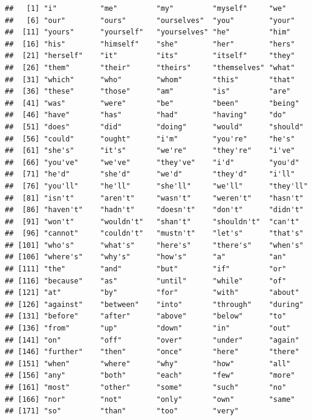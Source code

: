 \documentclass[]{book}
\begin{document}
\begin{verbatim}
##   [1] "i"          "me"         "my"         "myself"     "we"        
##   [6] "our"        "ours"       "ourselves"  "you"        "your"      
##  [11] "yours"      "yourself"   "yourselves" "he"         "him"       
##  [16] "his"        "himself"    "she"        "her"        "hers"      
##  [21] "herself"    "it"         "its"        "itself"     "they"      
##  [26] "them"       "their"      "theirs"     "themselves" "what"      
##  [31] "which"      "who"        "whom"       "this"       "that"      
##  [36] "these"      "those"      "am"         "is"         "are"       
##  [41] "was"        "were"       "be"         "been"       "being"     
##  [46] "have"       "has"        "had"        "having"     "do"        
##  [51] "does"       "did"        "doing"      "would"      "should"    
##  [56] "could"      "ought"      "i'm"        "you're"     "he's"      
##  [61] "she's"      "it's"       "we're"      "they're"    "i've"      
##  [66] "you've"     "we've"      "they've"    "i'd"        "you'd"     
##  [71] "he'd"       "she'd"      "we'd"       "they'd"     "i'll"      
##  [76] "you'll"     "he'll"      "she'll"     "we'll"      "they'll"   
##  [81] "isn't"      "aren't"     "wasn't"     "weren't"    "hasn't"    
##  [86] "haven't"    "hadn't"     "doesn't"    "don't"      "didn't"    
##  [91] "won't"      "wouldn't"   "shan't"     "shouldn't"  "can't"     
##  [96] "cannot"     "couldn't"   "mustn't"    "let's"      "that's"    
## [101] "who's"      "what's"     "here's"     "there's"    "when's"    
## [106] "where's"    "why's"      "how's"      "a"          "an"        
## [111] "the"        "and"        "but"        "if"         "or"        
## [116] "because"    "as"         "until"      "while"      "of"        
## [121] "at"         "by"         "for"        "with"       "about"     
## [126] "against"    "between"    "into"       "through"    "during"    
## [131] "before"     "after"      "above"      "below"      "to"        
## [136] "from"       "up"         "down"       "in"         "out"       
## [141] "on"         "off"        "over"       "under"      "again"     
## [146] "further"    "then"       "once"       "here"       "there"     
## [151] "when"       "where"      "why"        "how"        "all"       
## [156] "any"        "both"       "each"       "few"        "more"      
## [161] "most"       "other"      "some"       "such"       "no"        
## [166] "nor"        "not"        "only"       "own"        "same"      
## [171] "so"         "than"       "too"        "very"
\end{verbatim}
\end{document}
